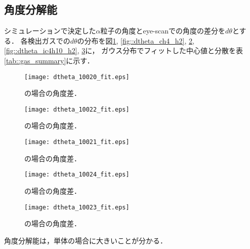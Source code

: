 \documentclass[../master]{subfiles}
\begin{document}
\subsection{角度分解能}
シミュレーションで決定した$\alpha$粒子の角度とeye-scanでの角度の差分を$d\theta$とする．
各検出ガスでの$d\theta$の分布を図\ref{fig::dtheta_ch4}, \ref{fig::dtheta_ch4_h2}, \ref{fig::dtheta_ch4_he},
\ref{fig::dtheta_ic4h10_h2}, \ref{fig::dtheta_ic4h10_he}に，
ガウス分布でフィットした中心値と分散を表\ref{tab::gas_summary}に示す．
\begin{figure}
  \centering
  \begin{minipage}{0.45\columnwidth}
    \centering
    \texttt{[image: dtheta\_10020\_fit.eps]}
    \caption{\Methane の場合の角度差．}
    \label{fig::dtheta_ch4}
  \end{minipage}  
\end{figure}
\begin{figure}
  \centering
  \begin{minipage}{0.45\columnwidth}
    \centering
    \texttt{[image: dtheta\_10022\_fit.eps]}
    \caption{\MethaneHydro の場合の角度差．}
    \label{fig::dtheta_ch4_h2}
  \end{minipage}
  \begin{minipage}{0.45\columnwidth}
    \centering
    \texttt{[image: dtheta\_10021\_fit.eps]}
    \caption{\MethaneHerium の場合の角度差．}
    \label{fig::dtheta_ch4_he}
  \end{minipage}
\end{figure}
\begin{figure}
  \centering
  \begin{minipage}{0.45\columnwidth}
    \centering
    \texttt{[image: dtheta\_10024\_fit.eps]}
    \caption{\isoButaneHydro の場合の角度差．}
    \label{fig::dtheta_ic4h10_h2}
  \end{minipage}
  \begin{minipage}{0.45\columnwidth}
    \centering
    \texttt{[image: dtheta\_10023\_fit.eps]}
    \caption{\isoButaneHerium の場合の角度差．}
    \label{fig::dtheta_ic4h10_he}
  \end{minipage}
\end{figure}
角度分解能は，\Methane 単体の場合に大きいことが分かる．
\end{document}
